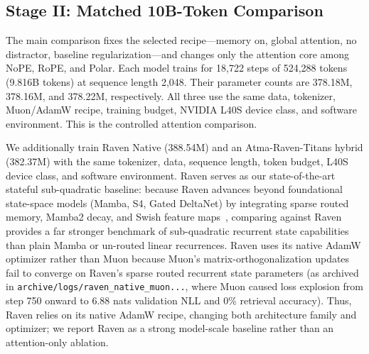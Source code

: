 \documentclass{article} %
\begin{document}
\subsection{Stage II: Matched 10B-Token Comparison}
The main comparison fixes the selected recipe---memory on, global attention, no distractor, baseline regularization---and changes only the attention core among NoPE, RoPE, and Polar. Each model trains for 18,722 steps of 524,288 tokens (9.816B tokens) at sequence length 2,048. Their parameter counts are 378.18M, 378.16M, and 378.22M, respectively. All three use the same data, tokenizer, Muon/AdamW recipe, training budget, NVIDIA L40S device class, and software environment. This is the controlled attention comparison.

We additionally train Raven Native (388.54M) and an Atma-Raven-Titans hybrid (382.37M) with the same tokenizer, data, sequence length, token budget, L40S device class, and software environment. Raven serves as our state-of-the-art stateful sub-quadratic baseline: because Raven advances beyond foundational state-space models (Mamba, S4, Gated DeltaNet) by integrating sparse routed memory, Mamba2 decay, and Swish feature maps~\citep{raven2026}, comparing against Raven provides a far stronger benchmark of sub-quadratic recurrent state capabilities than plain Mamba or un-routed linear recurrences. Raven uses its native AdamW optimizer rather than Muon because Muon's matrix-orthogonalization updates fail to converge on Raven's sparse routed recurrent state parameters (as archived in \texttt{archive/logs/raven\_native\_muon...}, where Muon caused loss explosion from step 750 onward to $6.88$ nats validation NLL and 0\% retrieval accuracy). Thus, Raven relies on its native AdamW recipe, changing both architecture family and optimizer; we report Raven as a strong model-scale baseline rather than an attention-only ablation.
\end{document}
